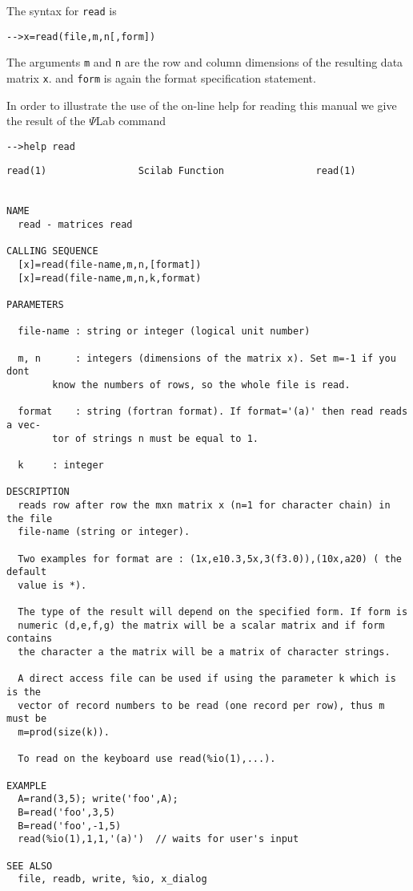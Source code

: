 	The syntax for {\tt read} is
\begin{verbatim}
-->x=read(file,m,n[,form])
\end{verbatim}
The arguments {\tt m} and {\tt n}
are the row and column dimensions of the resulting data matrix {\tt x}.
and {\tt form} is again the format specification statement.

In order to illustrate the use of the on-line help for reading this manual
we give the result of the $\Psi$Lab command 
\begin{verbatim}
-->help read
\end{verbatim}

\begin{verbatim}
read(1)			       Scilab Function			      read(1)


NAME
  read - matrices read

CALLING	SEQUENCE
  [x]=read(file-name,m,n,[format])
  [x]=read(file-name,m,n,k,format)

PARAMETERS

  file-name : string or	integer	(logical unit number)

  m, n	    : integers (dimensions of the matrix x). Set m=-1 if you dont
	    know the numbers of	rows, so the whole file	is read.

  format    : string (fortran format). If format='(a)' then read reads a vec-
	    tor	of strings n must be equal to 1.

  k	    : integer

DESCRIPTION
  reads	row after row the mxn matrix x (n=1 for	character chain) in the	file
  file-name (string or integer).

  Two examples for format are :	(1x,e10.3,5x,3(f3.0)),(10x,a20)	( the default
  value	is *).

  The type of the result will depend on	the specified form. If form is
  numeric (d,e,f,g) the	matrix will be a scalar	matrix and if form contains
  the character	a the matrix will be a matrix of character strings.

  A direct access file can be used if using the	parameter k which is is	the
  vector of record numbers to be read (one record per row), thus m must	be
  m=prod(size(k)).

  To read on the keyboard use read(%io(1),...).

EXAMPLE
  A=rand(3,5); write('foo',A);
  B=read('foo',3,5)
  B=read('foo',-1,5)
  read(%io(1),1,1,'(a)')  // waits for user's input

SEE ALSO
  file,	readb, write, %io, x_dialog
\end{verbatim}

